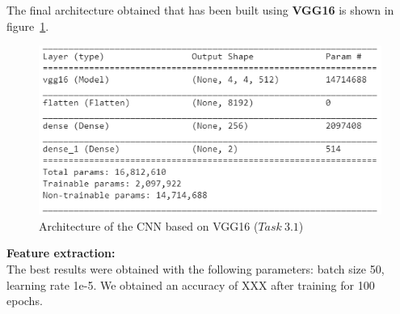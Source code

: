 \documentclass[11pt,a4paper,oneside]{article}
\begin{document}
The final architecture obtained that has been built using \textbf{VGG16} is shown in figure~\ref{fig:vgg16_model}. 

\begin{figure}[h]
\centering
\includegraphics[width=.5\textwidth]{images/Task 3/VGG16 3.1/Model}
\caption{Architecture of the CNN based on VGG16 ($Task\ 3.1$)}
\label{fig:vgg16_model}
\end{figure}

\textbf{Feature extraction:}\\
The best results were obtained with the following parameters: batch size 50, learning rate 1e-5. We obtained an accuracy of XXX after training for 100 epochs.
\end{document}
